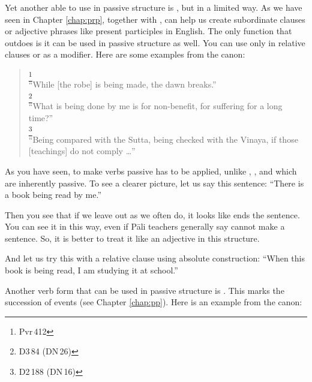 Yet another  able to use in passive structure is , but in a limited way. As we have seen in Chapter \ref{chap:prp}, together with ,  can help us create subordinate clauses or adjective phrases like present participles in English. The only function that  outdoes  is it can be used in passive structure as well. You can use  only in relative clauses or as a modifier. Here are some examples from the canon:

\begin{quote}
\footnote{Pvr\,412}\\
``While [the robe] is being made, the dawn breaks.''\\[1.5mm]
\footnote{D3\,84 (DN\,26)}\\
``What is being done by me is for non-benefit, for suffering for a long time?''\\[1.5mm]
\footnote{D2\,188 (DN\,16)}\\
``Being compared with the Sutta, being checked with the Vinaya, if those [teachings] do not comply \ldots''\\[1.5mm]
\end{quote}

As you have seen, to make  verbs passive  has to be applied, unlike , , and  which are inherently passive. To see a clearer picture, let us say this sentence: ``There is a book being read by me.''


Then you see that if we leave out  as we often do, it looks like  ends the sentence. You can see it in this way, even if P\=ali teachers generally say  cannot make a sentence. So, it is better to treat it like an adjective in this structure.

And let us try this with a relative clause using absolute construction: ``When this book is being read, I am studying it at school.''


Another verb form that can be used in passive structure is . This marks the succession of events (see Chapter \ref{chap:pp}). Here is an example from the canon:

